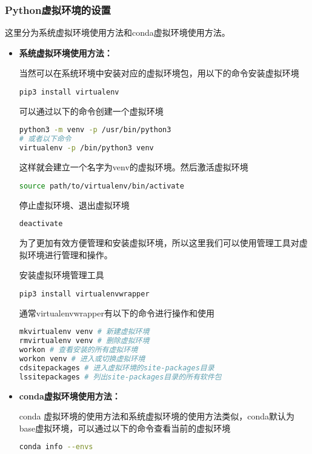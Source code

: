 \documentclass[lang=cn,a4paper,newtx]{elegantpaper}
\begin{document}
\subsubsection{Python虚拟环境的设置}
这里分为系统虚拟环境使用方法和conda虚拟环境使用方法。
\begin{itemize}
  \item \textbf{系统虚拟环境使用方法：}

当然可以在系统环境中安装对应的虚拟环境包，用以下的命令安装虚拟环境
\begin{lstlisting}[language=bash]
pip3 install virtualenv
\end{lstlisting}

  可以通过以下的命令创建一个虚拟环境
\begin{lstlisting}[language=bash]
python3 -m venv -p /usr/bin/python3
# 或者以下命令
virtualenv -p /bin/python3 venv
\end{lstlisting}

这样就会建立一个名字为venv的虚拟环境。然后激活虚拟环境
\begin{lstlisting}[language=bash]
source path/to/virtualenv/bin/activate
\end{lstlisting}

停止虚拟环境、退出虚拟环境
\begin{lstlisting}[language=bash]
deactivate
\end{lstlisting}
为了更加有效方便管理和安装虚拟环境，所以这里我们可以使用管理工具对虚拟环境进行管理和操作。

安装虚拟环境管理工具
\begin{lstlisting}[language=bash]
pip3 install virtualenvwrapper
\end{lstlisting}

通常virtualenvwrapper有以下的命令进行操作和使用
\begin{lstlisting}[language=bash]
mkvirtualenv venv # 新建虚拟环境
rmvirtualenv venv # 删除虚拟环境
workon # 查看安装的所有虚拟环境
workon venv # 进入或切换虚拟环境
cdsitepackages # 进入虚拟环境的site-packages目录
lssitepackages # 列出site-packages目录的所有软件包
\end{lstlisting}
\item \textbf{conda虚拟环境使用方法：}

conda 虚拟环境的使用方法和系统虚拟环境的使用方法类似，conda默认为base虚拟环境，可以通过以下的命令查看当前的虚拟环境
\begin{lstlisting}[language=bash]
conda info --envs
\end{lstlisting}


\end{itemize}
\end{document}
